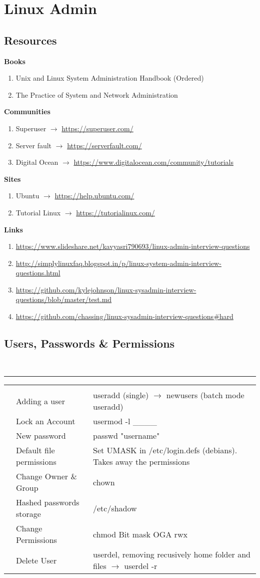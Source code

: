 \documentclass[11pt, noindent]{article}
\newcommand{\ra}{$\rightarrow$ {}}
\newcommand{\blank}{\_\_\_\_{} }
\newcounter{questionSec}
\newcounter{questionCount}[questionSec]
\newcommand{\qItem}[2]{\stepcounter{questionCount} \textbf{\thequestionCount} & #1 & #2\\}
\newenvironment{questions}[1]{\bgroup
	\centering{\large\textbf{#1}}\\
	\vspace{2pt}\hrule\vspace{12pt}

	\newenvironment{questionAnswer}{
		\begin{tabular}{|r| p{.35\textwidth}|p{.55\textwidth}|}
		\hline\hline
		&&\\
		\stepcounter{questionSec}
	}{\hline\end{tabular}\vspace{11pt}}
}{\egroup}
\begin{document}
\renewcommand\baselinestretch{1.2}

\section{Linux Admin}
\subsection{Resources}
	\textbf{Books}
		\begin{enumerate}
			\item Unix and Linux System Administration Handbook (Ordered)
			\item The Practice of System and Network Administration
		\end{enumerate}
	\textbf{Communities}
		\begin{enumerate}
			\item Superuser \ra \url{https://superuser.com/}
			\item Server fault \ra \url{https://serverfault.com/}
			\item Digital Ocean \ra \url{https://www.digitalocean.com/community/tutorials}
		\end{enumerate}
	\textbf{Sites}
		\begin{enumerate}
			\item Ubuntu \ra \url{https://help.ubuntu.com/}
			\item Tutorial Linux \ra \url{https://tutorialinux.com/}
		\end{enumerate}
	\textbf{Links}
		\begin{enumerate}
			\item \url{https://www.slideshare.net/kavyasri790693/linux-admin-interview-questions}
			\item \url{http://simplylinuxfaq.blogspot.in/p/linux-system-admin-interview-questions.html}
			\item \url{https://github.com/kylejohnson/linux-sysadmin-interview-questions/blob/master/test.md}
			\item \url{https://github.com/chassing/linux-sysadmin-interview-questions#hard}
		\end{enumerate}

\subsection{Users, Passwords \& Permissions}
\begin{questions}{Users}
	\begin{questionAnswer}
		\qItem{Adding a user}{useradd (single) \ra newusers (batch mode useradd)}
		\qItem{Lock an Account}{usermod -l \blank}
		\qItem{New password}{passwd "username"}
		\qItem{Default file permissions}{Set UMASK in /etc/login.defs (debians). Takes away the permissions}
		\qItem{Change Owner \& Group}{chown}
		\qItem{Hashed passwords storage}{/etc/shadow}
		\qItem{Change Permissions}{chmod Bit mask OGA rwx}
		\qItem{Delete User}{userdel, removing recusively home folder and files \ra userdel -r}
	\end{questionAnswer}
\end{questions}
\end{document}
